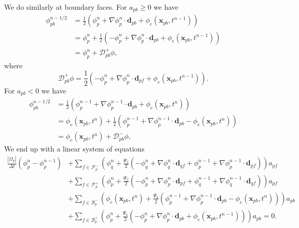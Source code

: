 \documentclass[../thesis.tex]{subfiles}
\begin{document}
We do similarly at boundary faces. For \(a_{pb} \geq 0\) we have
\begin{align*}
	\phi_{pb}^{n-1/2}
	&= \frac{1}{2}
	\left(
		\phi_p^{n} + \nabla\phi_p^{n}\cdot\boldsymbol{d}_{pb} + \phi_e(\boldsymbol{x}_{pb}, t^{n-1})
	\right)\\
	&= \phi_p^{n} + \frac{1}{2}
	\left(
		-\phi_p^{n} + \nabla\phi_p^{n}\cdot\boldsymbol{d}_{pb} + \phi_e(\boldsymbol{x}_{pb}, t^{n-1})
	\right)\\
	&= \phi_p^{n} + \mathcal{D}^+_{pb}\phi,
\end{align*}
where \[
	\mathcal{D}^+_{pb}\phi =
	\frac{1}{2}\left(
		-\phi_p^n + \nabla\phi_p^n\cdot\boldsymbol{d}_{pf} + \phi_e(\boldsymbol{x}_{pb}, t^{n-1})
		\right).
	\]
For \(a_{pb} < 0\) we have
\begin{align*}
	\phi_{pb}^{n-1/2}
	&= \frac{1}{2}
	\left(
		\phi_p^{n-1} + \nabla\phi_p^{n-1}\cdot\boldsymbol{d}_{pb} + \phi_e(\boldsymbol{x}_{pb}, t^{n})
	\right)\\
	&= \phi_e(\boldsymbol{x}_{pb}, t^{n}) + \frac{1}{2}
	\left(
		\phi_p^{n-1} + \nabla\phi_p^{n-1}\cdot\boldsymbol{d}_{pb} - \phi_e(\boldsymbol{x}_{pb}, t^{n})
	\right)\\
	&= \phi_e(\boldsymbol{x}_{pb}, t^{n}) + \mathcal{D}^-_{pb}\phi,
\end{align*}
We end up with a linear system of equations
\begin{equation}
	\begin{split}
		\frac{|\Omega_p|}{\Delta t}(\phi_p^{n} - \phi_p^{n-1})
	&+ \sum_{f \in \mathcal{F}_p^-}
	\left(
		\phi_q^n + \frac{\Psi_f}{2}
		\left(
			-\phi_q^n + \nabla\phi_q^n\cdot\boldsymbol{d}_{qf} +
			\phi_p^{n-1} + \nabla\phi_p^{n-1}\cdot\boldsymbol{d}_{pf}
		\right)
	\right) a_{pf}\\
	&+ \sum_{f \in \mathcal{F}_p^+}
	\left(
		\phi_p^n + \frac{\Psi_f}{2}
		\left(
			-\phi_p^n + \nabla\phi_p^n\cdot\boldsymbol{d}_{pf} +
			\phi_q^{n-1} + \nabla\phi_q^{n-1}\cdot\boldsymbol{d}_{qf}
		\right)
	\right) a_{pf}\\
	&+ \sum_{f \in \mathcal{B}_p^-}
	\left(
		\phi_e(\boldsymbol{x}_{pb}, t^{n}) + \frac{\Psi_b}{2}
		\left(
			\phi_p^{n-1} + \nabla\phi_p^{n-1}\cdot\boldsymbol{d}_{pb}
			- \phi_e(\boldsymbol{x}_{pb}, t^{n})
		\right)
	\right) a_{pb}\\
	&+ \sum_{f \in \mathcal{B}_p^+}
	\left(
		\phi_p^{n} + \frac{\Psi_b}{2}
		\left(
			-\phi_p^{n} + \nabla\phi_p^{n}\cdot\boldsymbol{d}_{pb}
			+ \phi_e(\boldsymbol{x}_{pb}, t^{n-1})
		\right)
	\right) a_{pb} = 0.
	\end{split}
\end{equation}
\end{document}
